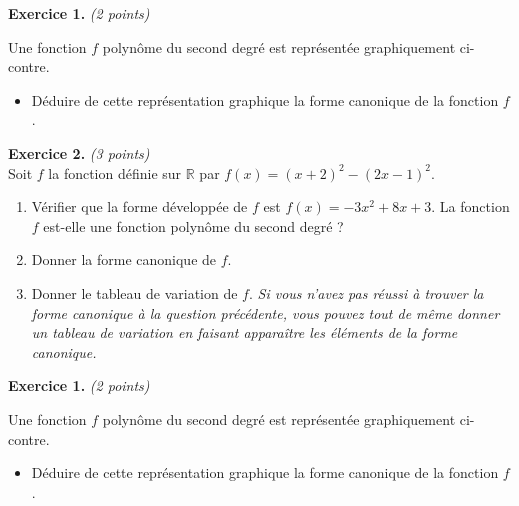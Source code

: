 \documentclass[11pt]{article}
\begin{document}
\noindent\textbf{Exercice 1.} \hspace{.5cm}\emph{(2 points)}\\
  \begin{minipage}{.47\textwidth}
  Une fonction $f$ polynôme du second degré est représentée graphiquement
  ci-contre.
 \begin{itemize}
    \item Déduire de cette représentation graphique la forme canonique de la
      fonction $f$.
  \end{itemize}
\end{minipage}
\begin{minipage}{.47\textwidth}
  \begin{center}
\end{center}
\end{minipage}

\noindent\textbf{Exercice 2.} \hspace{.5cm}\emph{(3 points)}\\
Soit $f$ la fonction définie sur $\mathbb{R}$ par $f(x)=(x+2)^2-(2x-1)^2$.
\begin{enumerate}
  \item Vérifier que la forme développée de $f$ est $f(x) = -3x^2+8x+3$.
    La fonction $f$ est-elle une fonction polynôme du second degré ?
  \item Donner la forme canonique de $f$.
  \item Donner le tableau de variation de $f$. \emph{Si vous n'avez pas réussi à
    trouver la forme canonique à la question précédente, vous pouvez tout de
    même donner un tableau de variation en faisant apparaître les éléments
    de la forme canonique.}
\end{enumerate}
\vspace{4cm}
\noindent\textbf{Exercice 1.} \hspace{.5cm}\emph{(2 points)}\\
  \begin{minipage}{.47\textwidth}
  Une fonction $f$ polynôme du second degré est représentée graphiquement
  ci-contre.
 \begin{itemize}
    \item Déduire de cette représentation graphique la forme canonique de la
      fonction $f$.
  \end{itemize}
\end{minipage}
\begin{minipage}{.47\textwidth}
  \begin{center}
\end{center}
\end{minipage}
\end{document}
